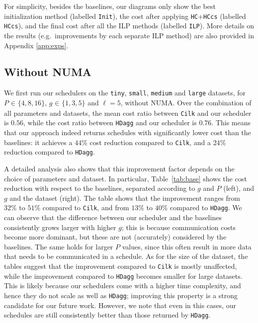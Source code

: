 \documentclass[sigconf,nonacm]{acmart}
\begin{document}
For simplicity, besides the baselines, our diagrams only show the best initialization method (labelled \texttt{Init}), the cost after applying \texttt{HC}+\texttt{HCcs} (labelled \texttt{HCcs}), and the final cost after all the ILP methods (labelled \texttt{ILP}). More details on the results (e.g.\ improvements by each separate ILP method) are also provided in Appendix \ref{app:exps}.

\subsection{Without NUMA} \label{sec:nonnumaexp}

We first run our schedulers on the \texttt{tiny}, \texttt{small}, \texttt{medium} and \texttt{large} datasets, for $P _{\!} \in _{\!} \{ 4, 8, 16 \}$, $g _{\!} \in _{\!} \{1, 3, 5\}$ and $\ell\!=\!5$, without NUMA. Over the combination of all parameters and datasets, the mean cost ratio between \texttt{Cilk} and our scheduler is $0.56$, while the cost ratio between \texttt{HDagg} and our scheduler is $0.76$. This means that our approach indeed returns schedules with significantly lower cost than the baselines: it achieves a $44\%$ cost reduction compared to \texttt{Cilk}, and a $24\%$ reduction compared to \texttt{HDagg}.

A detailed analysis also shows that this improvement factor depends on the choice of parameters and dataset. In particular, Table~\ref{tab:base} shows the cost reduction with respect to the baselines, separated according to $g$ and $P$ (left), and $g$ and the dataset (right). The table shows that the improvement ranges from $32\%$ to $51\%$ compared to \texttt{Cilk}, and from $13\%$ to $40\%$ compared to \texttt{HDagg}. We can observe that the difference between our scheduler and the baselines consistently grows larger with higher $g$; this is because communication costs become more dominant, but these are not (accurately) considered by the baselines. The same holds for larger $P$ values, since this often result in more data that needs to be communicated in a schedule. As for the size of the dataset, the tables suggest that the improvement compared to \texttt{Cilk} is mostly unaffected, while the improvement compared to \texttt{HDagg} becomes smaller for large datasets. This is likely because our schedulers come with a higher time complexity, and hence they do not scale as well as \texttt{HDagg}; improving this property is a strong candidate for our future work. However, we note that even in this cases, our schedules are still consistently better than those returned by \texttt{HDagg}.
\end{document}
